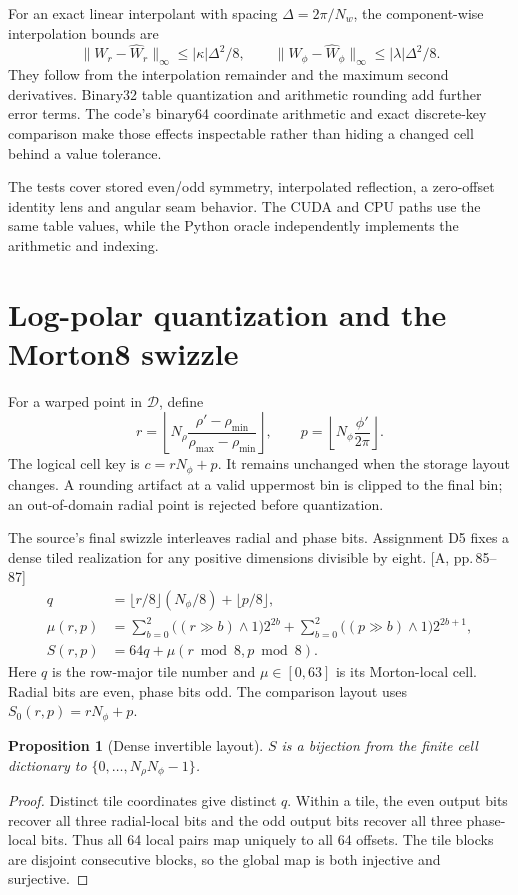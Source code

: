 \documentclass[11pt,a4paper]{article}
\newcommand{\src}[1]{\textcolor{muted}{[A, #1]}}
\newtheorem{proposition}{Proposition}[section]
\begin{document}
For an exact linear interpolant with spacing $\Delta=2\pi/N_w$, the component-wise interpolation bounds are
\begin{equation}
\|W_r-\widehat W_r\|_\infty\le |\kappa|\Delta^2/8,\qquad
\|W_\phi-\widehat W_\phi\|_\infty\le |\lambda|\Delta^2/8.
\end{equation}
They follow from the interpolation remainder and the maximum second derivatives. Binary32 table quantization and arithmetic rounding add further error terms. The code's binary64 coordinate arithmetic and exact discrete-key comparison make those effects inspectable rather than hiding a changed cell behind a value tolerance.

The tests cover stored even/odd symmetry, interpolated reflection, a zero-offset identity lens and angular seam behavior. The CUDA and CPU paths use the same table values, while the Python oracle independently implements the arithmetic and indexing.
\clearpage

\section{Log-polar quantization and the Morton8 swizzle}
For a warped point in $\mathcal D$, define
\begin{equation}
r=\left\lfloor N_\rho\frac{\rho'-\rho_{\min}}{\rho_{\max}-\rho_{\min}}\right\rfloor,
\qquad p=\left\lfloor N_\phi\frac{\phi'}{2\pi}\right\rfloor.
\end{equation}
The logical cell key is $c=rN_\phi+p$. It remains unchanged when the storage layout changes. A rounding artifact at a valid uppermost bin is clipped to the final bin; an out-of-domain radial point is rejected before quantization.

The source's final swizzle interleaves radial and phase bits. Assignment D5 fixes a dense tiled realization for any positive dimensions divisible by eight. \src{pp.\,85--87}
\begin{align}
q&=\lfloor r/8\rfloor(N_\phi/8)+\lfloor p/8\rfloor,\\
\mu(r,p)&=\sum_{b=0}^2\big((r\gg b)\land1\big)2^{2b}
+\sum_{b=0}^2\big((p\gg b)\land1\big)2^{2b+1},\\
S(r,p)&=64q+\mu(r\bmod8,p\bmod8).
\end{align}
Here $q$ is the row-major tile number and $\mu\in[0,63]$ is its Morton-local cell. Radial bits are even, phase bits odd. The comparison layout uses $S_0(r,p)=rN_\phi+p$.

\begin{proposition}[Dense invertible layout]
$S$ is a bijection from the finite cell dictionary to $\{0,\ldots,N_\rho N_\phi-1\}$.
\end{proposition}
\begin{proof}
Distinct tile coordinates give distinct $q$. Within a tile, the even output bits recover all three radial-local bits and the odd output bits recover all three phase-local bits. Thus all 64 local pairs map uniquely to all 64 offsets. The tile blocks are disjoint consecutive blocks, so the global map is both injective and surjective.
\end{proof}
\end{document}
